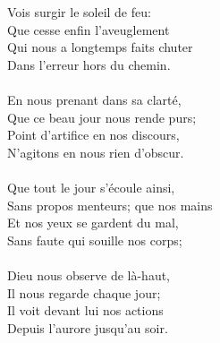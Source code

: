 Vois surgir le soleil de feu:\\
Que cesse enfin l’aveuglement\\
Qui nous a longtemps faits chuter\\
Dans l’erreur hors du chemin.\\
\\
En nous prenant dans sa clarté,\\
Que ce beau jour nous rende purs;\\
Point d’artifice en nos discours,\\
N’agitons en nous rien d’obscur.\\
\\
Que tout le jour s’écoule ainsi,\\
Sans propos menteurs; que nos mains\\
Et nos yeux se gardent du mal,\\
Sans faute qui souille nos corps;\\
\\
Dieu nous observe de là-haut,\\
Il nous regarde chaque jour;\\
Il voit devant lui nos actions\\
Depuis l’aurore jusqu’au soir.